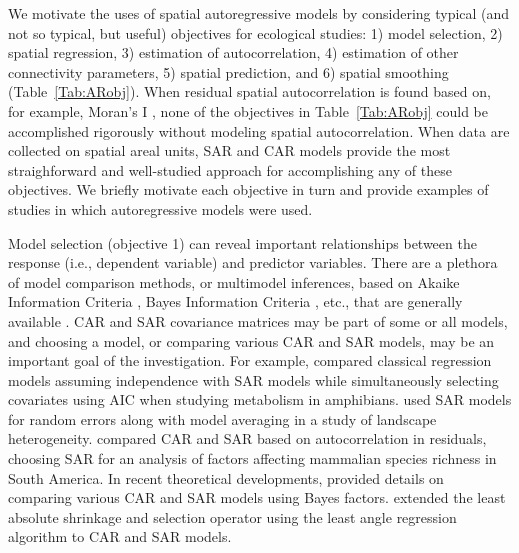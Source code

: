 \documentclass[11pt, titlepage]{article}\usepackage[]{graphicx}\usepackage[]{color}
\begin{document}
\begin{spacing}{1.9}
\begin{flushleft}
We motivate the uses of spatial autoregressive models by considering typical (and not so typical, but useful) objectives for ecological studies: 1) model selection, 2) spatial regression, 3) estimation of autocorrelation, 4) estimation of other connectivity parameters, 5) spatial prediction, and 6) spatial smoothing (Table~\ref{Tab:ARobj}).  When residual spatial autocorrelation is found based on, for example, Moran's I \citep{Mora:inte:1948,Soka:Oden:spat:1978}, none of the objectives in Table~\ref{Tab:ARobj} could be accomplished rigorously without modeling spatial autocorrelation.  When data are collected on spatial areal \citep[also called lattice,][]{Cres:stat:1993} units, SAR and CAR models provide the most straighforward and well-studied approach for accomplishing any of these objectives.  We briefly motivate each objective in turn and provide examples of studies in which autoregressive models were used.

Model selection (objective 1) can reveal important relationships between the response (i.e., dependent variable) and predictor variables.  There are a plethora of model comparison methods, or multimodel inferences, based on Akaike Information Criteria \citep[AIC,][]{Akai:Info:1973}, Bayes Information Criteria \citep[BIC,][]{Schw:esti:1978}, etc., that are generally available \citep[e.g.,][]{Burn:Ande:mode:2002,Hoot:Hobb:guid:2015}.  CAR and SAR covariance matrices may be part of some or all models, and choosing a model, or comparing various CAR and SAR models, may be an important goal of the investigation. For example, \citet{Cass:Dini:Rang:Thia:spat:2007} compared classical regression models assuming independence with SAR models while simultaneously selecting covariates using AIC when studying metabolism in amphibians. \citet{Qui:Turn:impo:2015} used SAR models for random errors along with model averaging in a study of landscape heterogeneity. \citet{Togn:Kelt:anal:2004} compared CAR and SAR based on autocorrelation in residuals, choosing SAR for an analysis of factors affecting mammalian species richness in South America.  In recent theoretical developments, \citet{Song:DeOl:Baye:2012} provided details on comparing various CAR and SAR models using Bayes factors. \citet{Zhu:Huan:Reye:sele:2010} extended the least absolute shrinkage and selection operator \citep[LASSO, ][]{Tibs:regr:1996} using the least angle regression algorithm \citep[LARS, ][]{Efro:Hast:John:Tibs:leas:2004} to CAR and SAR models. 


\end{flushleft}
\end{spacing}
\end{document}
